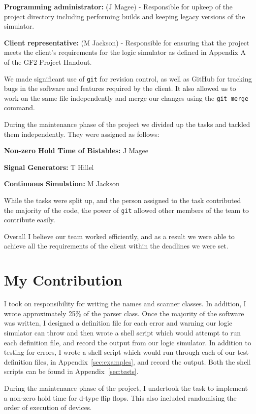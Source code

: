 \documentclass[a4paper,10pt]{article}
\begin{document}
\textbf{Programming administrator:} (J Magee) - Responsible for upkeep of the project directory including performing builds and keeping legacy versions of the simulator.

\textbf{Client representative:} (M Jackson) - Responsible for ensuring that the project meets the client's requirements for the logic simulator as defined in Appendix A of the GF2 Project Handout.

We made significant use of \texttt{git} for revision control, as well as GitHub for tracking bugs in the software and features required by the client. It also allowed us to work on the same file independently and merge our changes using the \texttt{git merge} command.

During the maintenance phase of the project we divided up the tasks and tackled them independently. They were assigned as follows:

\textbf{Non-zero Hold Time of Bistables:} J Magee

\textbf{Signal Generators:} T Hillel

\textbf{Continuous Simulation:} M Jackson

While the tasks were split up, and the person assigned to the task contributed the majority of the code, the power of \texttt{git} allowed other members of the team to contribute easily.

Overall I believe our team worked efficiently, and as a result we were able to achieve all the requirements of the client within the deadlines we were set.

\section{My Contribution}

I took on responsibility for writing the names and scanner classes. In addition, I wrote approximately 25\% of the parser class. Once the majority of the software was written, I designed a definition file for each error and warning our logic simulator can throw and then wrote a shell script which would attempt to run each definition file, and record the output from our logic simulator. In addition to testing for errors, I wrote a shell script which would run through each of our test definition files, in Appendix~\ref{sec:examples}, and record the output. Both the shell scripts can be found in Appendix~\ref{sec:tests}.

During the maintenance phase of the project, I undertook the task to implement a non-zero hold time for d-type flip flops. This also included randomising the order of execution of devices.
\end{document}
